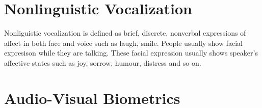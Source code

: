 \section{Nonlinguistic Vocalization}
Nonliguistic vocalization is defined as brief, discrete, nonverbal expressions of affect in both face and voice \cite{petridis2011audiovisual} such as laugh, smile. People usually show facial expresison while they are talking. These facial expression usually shows speaker's affective states such as joy, sorrow, humour, distress and so on.
\section{Audio-Visual Biometrics}
